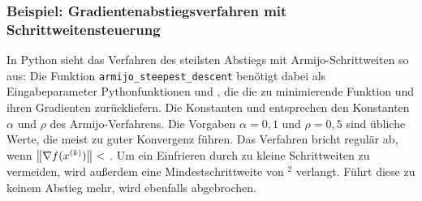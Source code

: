 \subsubsection{Beispiel: Gradientenabstiegsverfahren mit
  Schrittweitensteuerung}
\label{sec:armijosd}

In Python sieht das Verfahren des steilsten Abstiegs mit
Armijo-Schrittweiten so aus:
%
Die Funktion \lstinline!armijo_steepest_descent! benötigt dabei als
Eingabeparameter Pythonfunktionen  und , die die
zu minimierende Funktion und ihren Gradienten zurückliefern. Die
Konstanten  und  entsprechen den Konstanten
$\alpha$ und $\rho$ des Armijo-Verfahrens. Die Vorgaben $\alpha=0,1$
und $\rho=0,5$ sind übliche Werte, die meist zu guter Konvergenz
führen. Das Verfahren bricht regulär ab, wenn $\left\lVert{\nabla
  f(x^{(k)})}\right\rVert<$ . Um ein Einfrieren durch zu kleine
Schrittweiten zu vermeiden, wird außerdem eine Mindestschrittweite von
$^2$ verlangt. Führt diese zu keinem Abstieg mehr, wird
ebenfalls abgebrochen.

